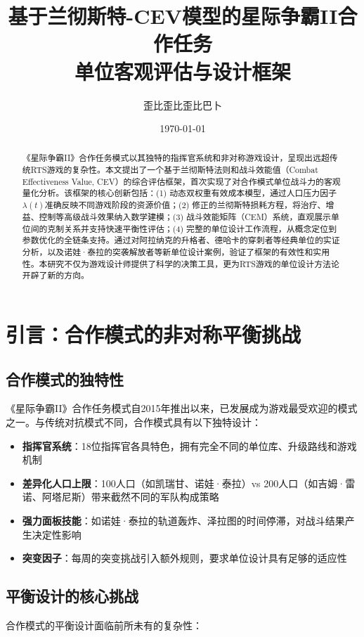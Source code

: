 \documentclass[a4paper,12pt]{article}
\title{\textbf{基于兰彻斯特-CEV模型的星际争霸II合作任务\\单位客观评估与设计框架}}
\author{歪比歪比歪比巴卜}
\date{\today}
\begin{document}
\maketitle

\begin{abstract}
\noindent
《星际争霸II》合作任务模式以其独特的指挥官系统和非对称游戏设计，呈现出远超传统RTS游戏的复杂性。本文提出了一个基于兰彻斯特法则和战斗效能值（Combat Effectiveness Value, CEV）的综合评估框架，首次实现了对合作模式单位战斗力的客观量化分析。该框架的核心创新包括：(1) 动态双权重有效成本模型，通过人口压力因子$\lambda(t)$准确反映不同游戏阶段的资源价值；(2) 修正的兰彻斯特损耗方程，将治疗、增益、控制等高级战斗效果纳入数学建模；(3) 战斗效能矩阵（CEM）系统，直观展示单位间的克制关系并支持快速平衡性评估；(4) 完整的单位设计工作流程，从概念定位到参数优化的全链条支持。通过对阿拉纳克的升格者、德哈卡的穿刺者等经典单位的实证分析，以及诺娃·泰拉的突袭解放者等新单位设计案例，验证了框架的有效性和实用性。本研究不仅为游戏设计师提供了科学的决策工具，更为RTS游戏的单位设计方法论开辟了新的方向。
\end{abstract}

\tableofcontents
\newpage

\section{引言：合作模式的非对称平衡挑战}

\subsection{合作模式的独特性}
《星际争霸II》合作任务模式自2015年推出以来，已发展成为游戏最受欢迎的模式之一。与传统对抗模式不同，合作模式具有以下独特设计：

\begin{itemize}
\item \textbf{指挥官系统}：18位指挥官各具特色，拥有完全不同的单位库、升级路线和游戏机制
\item \textbf{差异化人口上限}：100人口（如凯瑞甘、诺娃·泰拉）vs 200人口（如吉姆·雷诺、阿塔尼斯）带来截然不同的军队构成策略
\item \textbf{强力面板技能}：如诺娃·泰拉的轨道轰炸、泽拉图的时间停滞，对战斗结果产生决定性影响
\item \textbf{突变因子}：每周的突变挑战引入额外规则，要求单位设计具有足够的适应性
\end{itemize}

\subsection{平衡设计的核心挑战}
合作模式的平衡设计面临前所未有的复杂性：
\end{document}
